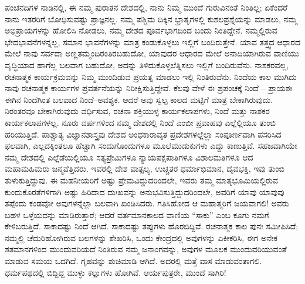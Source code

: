 ಪಂಚನದಿಗಳ ನಾಡಿನಲ್ಲಿ, ಈ ನಮ್ಮ ಪುರಾತನ ದೇಶದಲ್ಲಿ, ನಾನು ನಿಮ್ಮ ಮುಂದೆ ಗುರುವಿನಂತೆ ನಿಂತಿಲ್ಲ; ಏಕೆಂದರೆ ನಾನು ಇತರರಿಗೆ ಬೋಧಿಸುವಷ್ಟು ಪ್ರಾಜ್ಞನಲ್ಲ. ನಮ್ಮ ಪಶ್ಚಿಮ ದಿಕ್ಕಿನ ಭ್ರಾತೃಗಳಲ್ಲಿ ಕುಶಲಪ್ರಶ್ನೆಯನ್ನು ಮಾಡಲು, ನಮ್ಮ ಅಭಿಪ್ರಾಯಗಳನ್ನು ಹೋಲಿಸಿ ನೋಡಲು, ನಮ್ಮ ದೇಶದ ಪೂರ್ವಭಾಗದಿಂದ ಬಂದು ನಿಂತಿದ್ದೇನೆ. ನಮ್ಮಲ್ಲಿರುವ ಭೇದಭಾವನೆಗಳನ್ನಲ್ಲ, ಸಮಾನ ಭಾವನೆಗಳನ್ನು ಮಾತ್ರ ಕಂಡುಕೊಳ್ಳಲು ಇಲ್ಲಿಗೆ ಬಂದಿರುತ್ತೇನೆ. ಯಾವ ತತ್ತ್ವದ ಆಧಾರದ ಮೇಲೆ ನಾವು ಸರ್ವದಾ ಅಣ್ಣತಮ್ಮಂದಿರಂತಿರಬಹುದೋ, ಯಾವುದರ ಆಧಾರದ ಮೇಲೆ ಅನಾದಿಯಾಗಿರುವ ವಾಣಿಯು ವೃದ್ಧಿಯಾದ ಹಾಗೆಲ್ಲ ಬಲವಾಗ ಬಹುದೋ, ಅದನ್ನು ತಿಳಿದುಕೊಳ್ಳಲೆತ್ನಿಸಲು ಇಲ್ಲಿಗೆ ಬಂದಿರುವೆನು. ನಾಶಕರವಲ್ಲ, ರಚನಾತ್ಮಕ ಕಾರ್ಯಕ್ರಮವನ್ನು ನಿಮ್ಮ ಮುಂದಿಡುವ ಪ್ರಯತ್ನ ಮಾಡಲು ಇಲ್ಲಿ ನಿಂತಿರುವೆನು. ನಿಂದೆಯ ಕಾಲ ಮುಗಿದು ನಾವು ರಚನಾತ್ಮಕ ಕಾರ್ಯಗಳ ಪ್ರವರ್ತನೆಯನ್ನು ನಿರೀಕ್ಷಿಸುತ್ತಿದ್ದೇವೆ. ಕೆಲವು ವೇಳೆ ಈ ಪ್ರಪಂಚಕ್ಕೆ ನಿಂದೆ – ಪ್ರಾಯಶಃ ಈಗಿನ ನಿಂದೆಗಿಂತ ಬಲವಾದ ನಿಂದೆ–ಅವಶ್ಯಕ. ಆದರೆ ಅವು ಸ್ವಲ್ಪ ಕಾಲದ ಮಟ್ಟಿಗೆ ಮಾತ್ರ ಬೇಕಾಗಿರುವುದು. ನಿರಂತರವೂ ಬೇಕಾಗಿರುವುದು ವರ್ಧಿಸುವ, ರಚನಾ ಶಕ್ತಿಯುಳ್ಳ ಕಾರ್ಯಕಲಾಪಗಳು, ನಿಂದೆ ಮತ್ತು ನಾಶಕರ ಕಾರ್ಯಕಲಾಪಗಳಲ್ಲ. ನೂರು ವರ್ಷಗಳಿಂದ ನಮ್ಮ ದೇಶದಲ್ಲಿ ನಿಂದೆ ಎಂಬೀ ಪ್ರವಾಹವು ಎಲ್ಲೆಲ್ಲಿಯೂ ತುಂಬಿ ಹರಿಯುತ್ತಿದೆ. ಪಾಶ್ಚಾತ್ಯ ವಿಜ್ಞಾನಶಾಸ್ತ್ರವು ದೇಶದ ಅಂಧಕಾರಾವೃತ ಪ್ರದೇಶಗಳಲ್ಲೆಲ್ಲಾ ಸಂಪೂರ್ಣವಾಗಿ ಪಸರಿಸಿದ ಫಲವಾಗಿ, ಎಲ್ಲದಕ್ಕಿಂತಲೂ ಹೆಚ್ಚಾಗಿ ಸಂದುಗೊಂದುಗಳೂ ಮೂಲೆಮುಡುಕುಗಳು ಎದ್ದು ಕಾಣುತ್ತಿವೆ. ಸಹಜವಾಗಿಯೇ ನಮ್ಮ ದೇಶದಲ್ಲಿ ಎಲ್ಲೆಡೆಯಲ್ಲಿಯೂ ಸತ್ಯಪ್ರೇಮಿಗಳೂ ನ್ಯಾಯಪಕ್ಷಪಾತಿಗಳೂ ವಿಶಾಲಮತಿಗಳೂ ಆದ ಮಹಾಮಹಿಮರು ಜನ್ಮವೆತ್ತಿದರು. ಇವರಲ್ಲಿ ದೇಶ ವಾತ್ಸಲ್ಯ, ಉಚ್ಚತರ ಧರ್ಮಾಭಿಮಾನ, ದೈವಭಕ್ತಿ, ಇವು ತುಂಬಿ ತುಳುಕುತ್ತಿದ್ದುವು. ಈ ಮಹನೀಯರಿಗೆ ಅಷ್ಟು ಪ್ರೇಮವಿದ್ದುದರಿಂದಲೇ, ಇವರು ತಮ್ಮ ಮಾತೃಭೂಮಿಯಲ್ಲಿರುವ ಕುಂದುಕೊರತೆಗಳಿಗಾಗಿ ಅಷ್ಟು ಹಿರಿದಾದ ದುಃಖವನ್ನು ಅನುಭವಿಸುತ್ತಿದ್ದುದರಿಂದಲೇ, ಅವರಿಗೆ ಯಾವು ಯಾವುವು ತಪ್ಪೆಂದು ಕಂಡವೋ ಅವುಗಳನ್ನೆಲ್ಲಾ ಬಲವಾಗಿ ಖಂಡಿಸಿದರು. ಗತಿಸಿಹೋದ ಆ ಮಹಾತ್ಮರಿಗೆ ಜಯವಾಗಲಿ! ಅವರು ಬಹಳ ಒಳ್ಳೆಯದನ್ನು ಮಾಡಿರುತ್ತಾರೆ; ಆದರೆ ವರ್ತಮಾನಕಾಲದ ವಾಣಿಯ “ಸಾಕು” ಎಂಬ ಕೂಗು ನಮಗೆ ಕೇಳಿಬರುತ್ತಿದೆ. ಸಾಕಾದಷ್ಟು ನಿಂದೆ ಆಗಿದೆ. ಸಾಕಾದಷ್ಟು ತಪ್ಪುಗಳು ಹೊರಬಿದ್ದಿವೆ. ರಚನಾತ್ಮಕ ಕಾಲ ಪುನಃ ಸಮೀಪಿಸಿದೆ; ನಮ್ಮಲ್ಲಿ ಚೆದುರಿಹೋಗಿರುವ ಬಲಗಳನ್ನು ಶೇಖರಿಸಿ, ಒಂದು ಕೇಂದ್ರದಲ್ಲಿ ಅವುಗಳನ್ನು ಏಕೀಕರಿಸಿ, ಈಗ ಅನೇಕ ಶತಮಾನಗಳಿಂದ ಮುಂದುವರಿಯದೆ ನಿಂತಿರುವ ನಮ್ಮ ಜನಾಂಗವನ್ನು, ಅವುಗಳ ಮೂಲಕ ಮುಂದುವರಿಯುವಂತೆ ಮಾಡುವ ಸಮಯ ಒದಗಿದೆ. ಗೃಹವನ್ನು ಶುಚಿಮಾಡಿ ಆಗಿದೆ. ಅದರಲ್ಲಿ ಮತ್ತೆ ವಾಸ ಮಾಡುವಂತಾಗಲಿ. ಧರ್ಮಪಥದಲ್ಲಿ ಬಿದ್ದಿದ್ದ ಮುಳ್ಳು ಕಲ್ಲುಗಳು ಹೋಗಿವೆ. ಆರ್ಯಪುತ್ರರೇ, ಮುಂದೆ ಸಾಗಿರಿ!

\vskip 5pt

